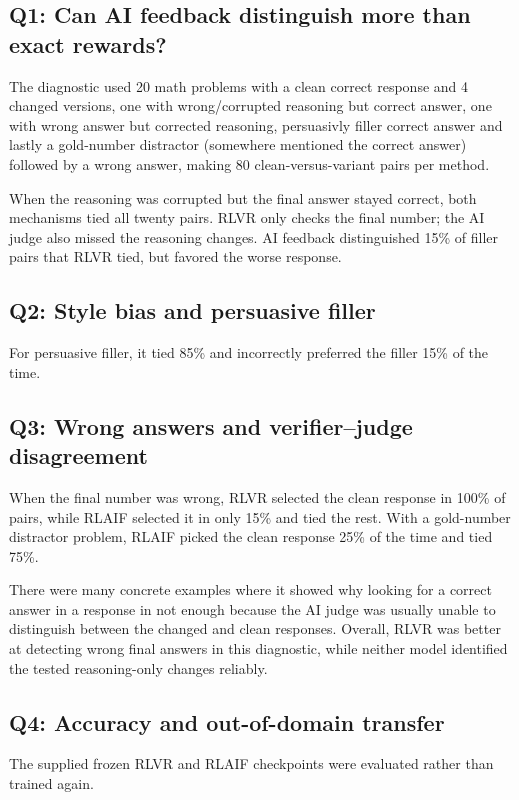\documentclass{article}
\begin{document}
\subsection{Q1: Can AI feedback distinguish more than exact rewards?}

The diagnostic used 20 math problems with a clean correct response and 4 changed versions, one with wrong/corrupted reasoning but correct answer, one with wrong answer but corrected reasoning, persuasivly filler correct answer and lastly a gold-number distractor (somewhere mentioned the correct answer) followed by a wrong answer, making 80 clean-versus-variant pairs per method.


When the reasoning was corrupted but the final answer stayed correct, both mechanisms tied all twenty pairs. RLVR only checks the final number; the AI judge also missed the reasoning changes. AI feedback distinguished 15\% of filler pairs that RLVR tied, but favored the worse response.

\subsection{Q2: Style bias and persuasive filler}
For persuasive filler, it tied 85\% and incorrectly preferred the filler 15\% of the time.

\subsection{Q3: Wrong answers and verifier--judge disagreement}
When the final number was wrong, RLVR selected the clean response in 100\% of pairs, while RLAIF selected it in only 15\% and tied the rest. With a gold-number distractor problem, RLAIF picked the clean response 25\% of the time and tied 75\%.

There were many concrete examples where it showed why looking for a correct answer in a response in not enough because the AI judge was usually unable to distinguish between the changed and clean responses. Overall, RLVR was better at detecting wrong final answers in this diagnostic, while neither model identified the tested reasoning-only changes reliably.

\subsection{Q4: Accuracy and out-of-domain transfer}
The supplied frozen RLVR and RLAIF checkpoints were evaluated rather than trained again.
\end{document}
